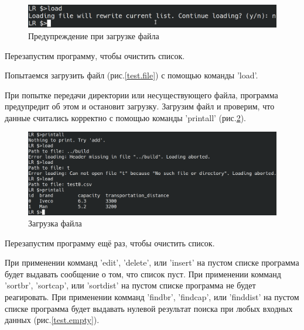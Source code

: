 \begin{figure}[H]
    \centering
    \includegraphics[width=0.9\linewidth]{photo/test.load.exist}
    \caption{Предупреждение при загрузке файла}
    \label{test.load.exist}
\end{figure}

Перезапустим программу, чтобы очистить список.

Попытаемся загрузить файл (рис.\ref{test.file}) с помощью команды 'load'.

При попытке передачи директории или несуществующего файла, 
программа предупредит об этом и остановит загрузку.
Загрузим файл и проверим, что данные считались корректно 
с помощью команды 'printall' (рис.\ref{test.load}).

\begin{figure}[H]
    \centering
    \includegraphics[width=0.9\linewidth]{photo/test.load}
    \caption{Загрузка файла}
    \label{test.load}
\end{figure}

Перезапустим программу ещё раз, чтобы очистить список.

При применении комманд
'edit',
'delete', или
'insert'
на пустом списке программа будет выдавать сообщение 
о том, что список пуст.
При применении комманд
'sortbr',
'sortcap', или
'sortdist'
на пустом списке программа не будет реагировать.
При применении комманд
'findbr',
'findcap', или
'finddist'
на пустом списке программа будет выдавать нулевой 
результат поиска при любых
входных данных (рис.\ref{test.empty}).

